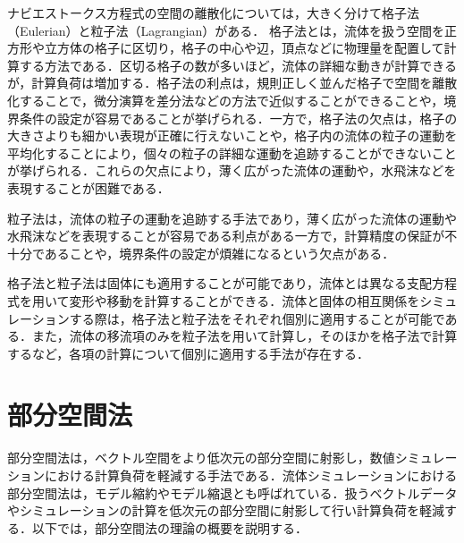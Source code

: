 \documentclass[a4j,12pt]{jreport}
\begin{document}
ナビエストークス方程式の空間の離散化については，大きく分けて格子法（Eulerian）と粒子法（Lagrangian）がある．
格子法とは，流体を扱う空間を正方形や立方体の格子に区切り，格子の中心や辺，頂点などに物理量を配置して計算する方法である．区切る格子の数が多いほど，流体の詳細な動きが計算できるが，計算負荷は増加する．格子法の利点は，規則正しく並んだ格子で空間を離散化することで，微分演算を差分法などの方法で近似することができることや，境界条件の設定が容易であることが挙げられる．一方で，格子法の欠点は，格子の大きさよりも細かい表現が正確に行えないことや，格子内の流体の粒子の運動を平均化することにより，個々の粒子の詳細な運動を追跡することができないことが挙げられる．これらの欠点により，薄く広がった流体の運動や，水飛沫などを表現することが困難である．

粒子法は，流体の粒子の運動を追跡する手法であり，薄く広がった流体の運動や水飛沫などを表現することが容易である利点がある一方で，計算精度の保証が不十分であることや，境界条件の設定が煩雑になるという欠点がある．

格子法と粒子法は固体にも適用することが可能であり，流体とは異なる支配方程式を用いて変形や移動を計算することができる．流体と固体の相互関係をシミュレーションする際は，格子法と粒子法をそれぞれ個別に適用することが可能である．また，流体の移流項のみを粒子法を用いて計算し，そのほかを格子法で計算するなど，各項の計算について個別に適用する手法が存在する．


\section{部分空間法}\label{sec:Subspace}
部分空間法は，ベクトル空間をより低次元の部分空間に射影し，数値シミュレーションにおける計算負荷を軽減する手法である．流体シミュレーションにおける部分空間法は，モデル縮約やモデル縮退とも呼ばれている．扱うベクトルデータやシミュレーションの計算を低次元の部分空間に射影して行い計算負荷を軽減する．以下では，部分空間法の理論の概要を説明する．
\end{document}

